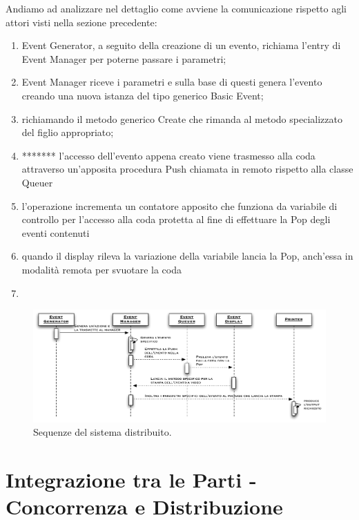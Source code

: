 \documentclass[aps,letterpaper,10pt]{article}
\begin{document}
Andiamo ad analizzare nel dettaglio come avviene la comunicazione rispetto agli attori visti nella sezione precedente:

\begin{enumerate}
	\item Event Generator, a seguito della creazione di un evento, richiama l'entry di Event Manager per poterne passare i parametri;
	\item Event Manager riceve i parametri e sulla base di questi genera l'evento creando una nuova istanza del tipo generico Basic Event;
	\item richiamando il metodo generico Create che rimanda al metodo specializzato del figlio appropriato;
	\item ******* l'accesso dell'evento appena creato viene trasmesso alla coda attraverso un'apposita procedura Push chiamata in remoto rispetto alla classe Queuer
	\item l'operazione incrementa un contatore apposito che funziona da variabile di controllo per l'accesso alla coda protetta al fine di effettuare la Pop degli eventi contenuti
	\item quando il display rileva la variazione della variabile lancia la Pop, anch'essa in modalit\`a remota per svuotare la coda
	\item 
\end{enumerate}

\begin{figure}[H]
	\begin{center}
		\includegraphics[width=500px]{images/dist-sequence.pdf}
	\end{center}
\caption{Sequenze del sistema distribuito.}
\end{figure}


\subsection{}

\newpage

\section{Integrazione tra le Parti - Concorrenza e Distribuzione}
\end{document}
